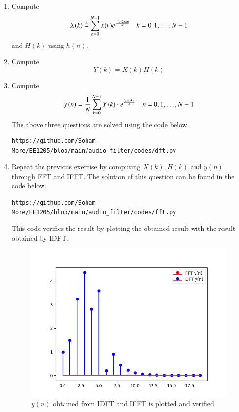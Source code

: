 \documentclass[journal,12pt,twocolumn]{IEEEtran}
\newcommand{\define}{\stackrel{\triangle}{=}}
\theoremstyle{remark}
\begin{document}
\begin{enumerate}[label=\thesection.\arabic*]
\item
Compute
\begin{equation}
X(k) \define \sum _{n=0}^{N-1}x(n) e^\frac{-\j2\pi kn}{N} \quad k = 0,1,\dots, N-1
\end{equation}
and $H(k)$ using $h(n)$.
\item Compute 
\begin{equation}
Y(k) = X(k)H(k)
\label{eq:fp}
\end{equation}
\item Compute
\begin{equation}
y\brak{n}={\frac {1}{N}}\sum _{k=0}^{N-1}Y\brak{k}\cdot e^\frac{\j 2\pi kn}{N} \quad n = 0,1,\dots, N-1
\label{eq:inv-ft}
\end{equation}
\solution The above three questions are solved using the code below.
\begin{lstlisting}
https://github.com/Soham-More/EE1205/blob/main/audio_filter/codes/dft.py
\end{lstlisting}

\item Repeat the previous exercise by computing $X(k), H(k)$ and $y(n)$ through FFT and IFFT.
\solution The solution of this question can be found in the code below.
\begin{lstlisting}
https://github.com/Soham-More/EE1205/blob/main/audio_filter/codes/fft.py
\end{lstlisting}
This code verifies the result by plotting the obtained result with the result obtained by IDFT.

\begin{figure}[ht]
    \centering
    \includegraphics[width=\columnwidth]{figs/ft_comp.png}
    \caption{$y(n)$ obtained from IDFT and IFFT is plotted and verified}
    \label{fig:yn_verf_5.4}
\end{figure}


\end{enumerate}
\end{document}
